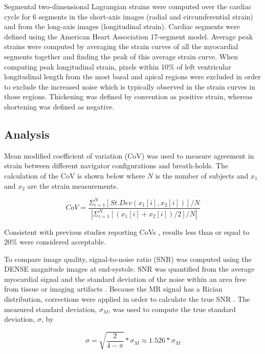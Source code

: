 	Segmental two-dimensional Lagrangian strains were computed over the cardiac cycle for 6 segments in the short-axis images (radial and circumferential strain) and from the long-axis images (longitudinal strain). Cardiac segments were defined using the American Heart Association 17-segment model. Average peak strains were computed by averaging the strain curves of all the myocardial segments together and finding the peak of this average strain curve. When computing peak longitudinal strain, pixels within 10\% of left ventricular longitudinal length from the most basal and apical regions were excluded in order to exclude the increased noise which is typically observed in the strain curves in those regions. Thickening was defined by convention as positive strain, whereas shortening was defined as negative.

\subsection{Analysis}
	Mean modified coefficient of variation (CoV) \cite{Wehner2015a,Haggerty2013,Wehner2015} was used to measure agreement in strain between different navigator configurations and breath-holds. The calculation of the CoV is shown below where $N$ is the number of subjects and $x_1$ and $x_2$ are the strain measurements.

\begin{equation}
	\label{eq:cov}
	CoV=\frac{\Sigma_{i=1}^N[St.Dev(x_1[i],x_2[i])]/N}{|\Sigma_{i=1}^N[(x_1[i]+x_2[i])/2]/N|}
\end{equation}

	Consistent with previous studies reporting CoVs \cite{Haggerty2013,Swoboda2014,Moody2015,Kowallick2014,Kowallick2016}, results less than or equal to 20\% were considered acceptable.
	
	To compare image quality, signal-to-noise ratio (SNR) was computed using the DENSE magnitude images at end-systole. SNR was quantified from the average myocardial signal and the standard deviation of the noise within an area free from tissue or imaging artifacts \cite{Wehner2015a,Wehner2015,Sigfridsson2011}. Because the MR signal has a Rician distribution, corrections were applied in order to calculate the true SNR \cite{Gudbjartsson1995}. The measured standard deviation, $\sigma_M$, was used to compute the true standard deviation, $\sigma$, by

\begin{equation}
	\sigma = \sqrt{\frac{2}{4-\pi}}*\sigma_M \approx 1.526*\sigma_M
\end{equation}

